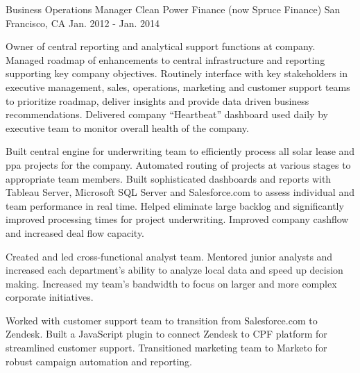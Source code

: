\begin{cventries}
\cventry
{Business Operations Manager} %
{Clean Power Finance (now Spruce Finance)} %
{San Francisco, CA} %
{Jan. 2012 - Jan. 2014} %
{ %
\begin{cvitems}
\item {Owner of central reporting and analytical support functions at company. Managed roadmap of enhancements to central infrastructure and reporting supporting key company objectives. Routinely interface with key stakeholders in executive management, sales, operations, marketing and customer support teams to prioritize roadmap, deliver insights and provide data driven business recommendations. Delivered company ``Heartbeat'' dashboard used daily by executive team to monitor overall health of the company.}
\item {Built central engine for underwriting team to efficiently process all solar lease and ppa projects for the company. Automated routing of projects at various stages to appropriate team members. Built sophisticated dashboards and reports with Tableau Server, Microsoft SQL Server and Salesforce.com to assess individual and team performance in real time. Helped eliminate large backlog and significantly improved processing times for project underwriting. Improved company cashflow and increased deal flow capacity.}
\item {Created and led cross-functional analyst team. Mentored junior analysts and increased each department’s ability to analyze local data and speed up decision making. Increased my team’s bandwidth to focus on larger and more complex corporate initiatives.}
\item {Worked with customer support team to transition from Salesforce.com to Zendesk. Built a JavaScript plugin to connect Zendesk to CPF platform for streamlined customer support. Transitioned marketing team to Marketo for robust campaign automation and reporting.}
\end{cvitems}
}


\end{cventries}
